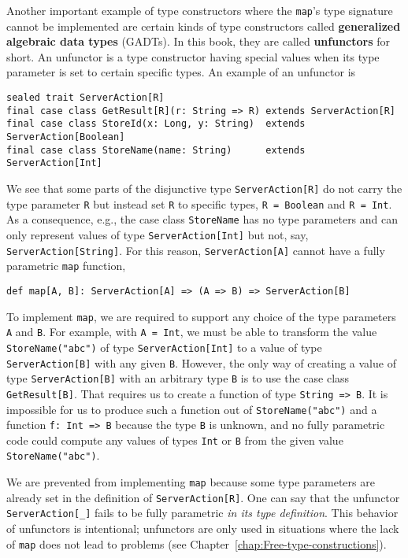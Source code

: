 Another important example of type constructors where the \lstinline!map!\textsf{'}s
type signature cannot be implemented are certain kinds of type constructors
called \textbf{generalized
algebraic data types} (GADTs). In this book, they are
called \textbf{unfunctors} for short. An unfunctor
is a type constructor having special values when its type parameter
is set to certain specific types. An example of an unfunctor is
\begin{lstlisting}
sealed trait ServerAction[R]
final case class GetResult[R](r: String => R) extends ServerAction[R]
final case class StoreId(x: Long, y: String)  extends ServerAction[Boolean]
final case class StoreName(name: String)      extends ServerAction[Int]
\end{lstlisting}
We see that some parts of the disjunctive type \lstinline!ServerAction[R]!
do not carry the type parameter \lstinline!R! but instead set \lstinline!R!
to specific types, \lstinline!R = Boolean! and \lstinline!R = Int!.
As a consequence, e.g., the case class \lstinline!StoreName! has
no type parameters and can only represent values of type \lstinline!ServerAction[Int]!
but not, say, \lstinline!ServerAction[String]!. For this reason,
\lstinline!ServerAction[A]! cannot have a fully parametric \lstinline!map!
function, 
\begin{lstlisting}
def map[A, B]: ServerAction[A] => (A => B) => ServerAction[B]
\end{lstlisting}
To implement \lstinline!map!, we are required to support any choice
of the type parameters \lstinline!A! and \lstinline!B!. For example,
with \lstinline!A = Int!, we must be able to transform the value
\lstinline!StoreName("abc")! of type \lstinline!ServerAction[Int]!
to a value of type \lstinline!ServerAction[B]! with any given \lstinline!B!.
However, the only way of creating a value of type \lstinline!ServerAction[B]!
with an arbitrary type \lstinline!B! is to use the case class \lstinline!GetResult[B]!.
That requires us to create a function of type \lstinline!String => B!.
It is impossible for us to produce such a function out of \lstinline!StoreName("abc")!
and a function \lstinline!f: Int => B! because the type \lstinline!B!
is unknown, and no fully parametric code could compute any values
of types \lstinline!Int! or \lstinline!B! from the given value \lstinline!StoreName("abc")!. 

We are prevented from implementing \lstinline!map! because some type
parameters are already set in the definition of \lstinline!ServerAction[R]!.
One can say that the unfunctor \lstinline!ServerAction[_]! fails
to be fully parametric \emph{in its type definition}. This behavior
of unfunctors is intentional; unfunctors are only used in situations
where the lack of \lstinline!map! does not lead to problems (see
Chapter~\ref{chap:Free-type-constructions}).

